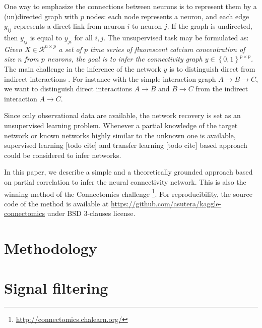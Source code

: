 \documentclass[wcp]{jmlr}
\begin{document}
One way to emphasize the connections between neurons is to represent them by a
(un)directed graph with $p$ nodes: each node represents a neuron, and each
edge $y_{ij}$ represents a direct link from neuron  $i$ to neuron $j$. If the
graph is undirected, then $y_{ij}$ is equal to $y_{ji}$  for all $i,j$.
The unsupervised task may be formulated as:
\textit{Given $X \in \mathcal{R}^{n \times p}$  a set of $p$ time series of
fluorescent calcium concentration of size $n$ from $p$ neurons, the goal is to
infer the connectivity graph $y \in \left\{0, 1\right\}^{p \times p}$.}
The main challenge in the inference of the network $y$
is to distinguish direct from indirect interactions \cite{de2004discovery}.
For instance with the simple interaction graph $A \rightarrow B \rightarrow C$,
we want to distinguish direct interactions $A \rightarrow B$ and $B \rightarrow C$
from the indirect interaction $A \rightarrow C$.

Since only observational data are available, the network recovery is set as an
unsupervised learning problem. Whenever a partial knowledge of the target
network or known networks highly similar to the unknown one is available,
supervised learning [todo cite] and transfer learning  [todo cite] based
approach could be considered to infer networks.

In this paper, we describe a simple and a theoretically grounded approach
based on partial correlation to infer the neural connectivity network.
This is also the winning method of the Connectomics challenge
\footnote{\url{http://connectomics.chalearn.org/}}. For reproducibility, the
source code of the method is available at
\url{https://github.com/asutera/kaggle-connectomics} under BSD 3-clauses
license.

\section{Methodology}
\section{Signal filtering} \label{sec:filter}
\end{document}

